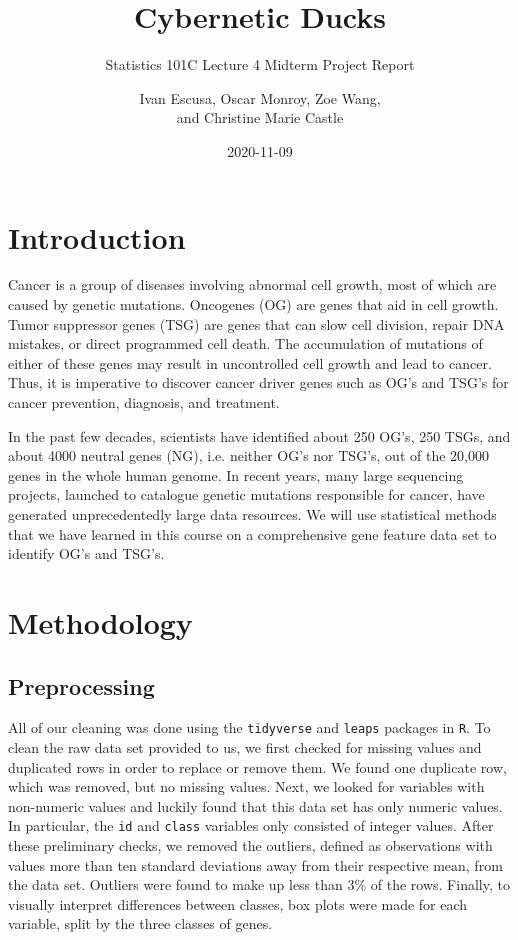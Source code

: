\documentclass{scrartcl}
\title{Cybernetic Ducks}
\subtitle{Statistics 101C Lecture 4 Midterm Project Report}
\author{Ivan Escusa, Oscar Monroy, Zoe Wang,\\and Christine Marie Castle}
\date{2020-11-09}
\begin{document}
\maketitle

\section{Introduction}

Cancer is a group of diseases involving abnormal cell growth, most of which are caused by genetic mutations. Oncogenes (OG) are genes that aid in cell growth. Tumor suppressor genes (TSG) are genes that can slow cell division, repair DNA mistakes, or direct programmed cell death. The accumulation of mutations of either of these genes may result in uncontrolled cell growth and lead to cancer. Thus, it is imperative to discover cancer driver genes such as OG's and TSG's for cancer prevention, diagnosis, and treatment.

In the past few decades, scientists have identified about 250 OG's, 250 TSGs, and about 4000 neutral genes (NG), i.e. neither OG's nor TSG's, out of the 20,000 genes in the whole human genome. In recent years, many large sequencing projects, launched to catalogue genetic mutations responsible for cancer, have generated unprecedentedly large data resources. We will use statistical methods that we have learned in this course on a comprehensive gene feature data set to identify OG's and TSG's.

\section{Methodology}

\subsection{Preprocessing}

All of our cleaning was done using the \verb|tidyverse| and \verb|leaps| packages in \verb|R|. To clean the raw data set provided to us, we first checked for missing values and duplicated rows in order to replace or remove them. We found one duplicate row, which was removed, but no missing values. Next, we looked for variables with non-numeric values and luckily found that this data set has only numeric values. In particular, the \verb|id| and \verb|class| variables only consisted of integer values. After these preliminary checks, we removed the outliers, defined as observations with values more than ten standard deviations away from their respective mean, from the data set. Outliers were found to make up less than 3\% of the rows. Finally, to visually interpret differences between classes, box plots were made for each variable, split by the three classes of genes.
\end{document}

